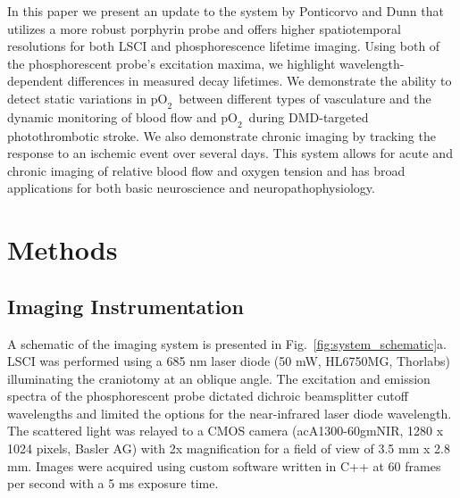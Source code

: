 \documentclass[12pt]{spieman}  %
\newcommand{\pO}{\ensuremath{\text{pO}_2}}
\begin{document}
\begin{spacing}{2}
In this paper we present an update to the system by Ponticorvo and Dunn \cite{Ponticorvo:2010uv} that utilizes a more robust porphyrin probe \cite{Esipova:2011hi} and offers higher spatiotemporal resolutions for both LSCI and phosphorescence lifetime imaging. Using both of the phosphorescent probe's excitation maxima, we highlight wavelength-dependent differences in measured decay lifetimes. We demonstrate the ability to detect static variations in \pO\ between different types of vasculature and the dynamic monitoring of blood flow and \pO\ during DMD-targeted photothrombotic stroke. We also demonstrate chronic imaging by tracking the response to an ischemic event over several days. This system allows for acute and chronic imaging of relative blood flow and oxygen tension and has broad applications for both basic neuroscience and neuropathophysiology.


\section{Methods}
\label{sect:methods}

\subsection{Imaging Instrumentation}
A schematic of the imaging system is presented in Fig.~\ref{fig:system_schematic}a. LSCI was performed using a 685 nm laser diode (50 mW, HL6750MG, Thorlabs) illuminating the craniotomy at an oblique angle. The excitation and emission spectra of the phosphorescent probe dictated dichroic beamsplitter cutoff wavelengths and limited the options for the near-infrared laser diode wavelength. The scattered light was relayed to a CMOS camera (acA1300-60gmNIR, 1280 x 1024 pixels, Basler AG) with 2x magnification for a field of view of 3.5 mm x 2.8 mm. Images were acquired using custom software written in C++ at 60 frames per second with a 5 ms exposure time.


\end{spacing}
\end{document}
